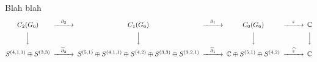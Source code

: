 \documentclass[final,xcolor=svgnames]{beamer}
\begin{document}
\begin{frame}{}
\begin{columns}
\begin{column}{0.5\textwidth}
    \end{column}
  \end{columns}

  \vfill

  \begin{block}{Blah blah}
    \[
    \begin{CD}
      C_{2}(G_{6}) @>{\partial_{2}}>> C_{1}(G_{6}) @>{\partial_{1}}>> C_{0}(G_{6}) @>{\varepsilon}>> \mathbb{C}\\
      @VVV   @VVV   @VVV   @VVV    \\
      S^{(4,1,1)}\oplus S^{(3,3)} @>{\widehat\partial_{2}}>>
      S^{(5,1)}\oplus S^{(4,1,1)}\oplus S^{(4,2)}\oplus S^{(3,3)}\oplus S^{(3,2,1)} @>{\widehat\partial_{1}}>> 
      \mathbb{C} \oplus S^{(5,1)}\oplus S^{(4,2)} @>{\widehat \varepsilon}>>  \mathbb{C}
    \end{CD}
    \]
  \end{block}
\end{frame}
\end{document}
